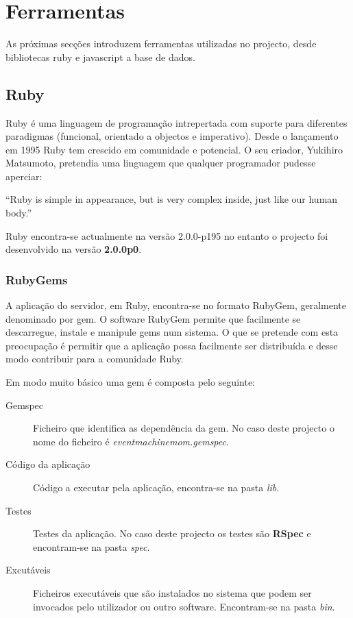 \section{Ferramentas}

As próximas secções introduzem ferramentas utilizadas no projecto, desde bibliotecas ruby e javascript a base de dados.

\subsection{Ruby}

Ruby é uma linguagem de programação intrepertada com suporte para diferentes paradigmas (funcional, orientado a objectos e imperativo). Desde o lançamento em 1995 Ruby tem crescido em comunidade e potencial. O seu criador, Yukihiro Matsumoto, pretendia uma linguagem que qualquer programador pudesse aperciar:

``Ruby is simple in appearance, but is very complex inside, just like our human body.'' \cite{matz}

Ruby encontra-se actualmente na versão 2.0.0-p195 no entanto o projecto foi desenvolvido na versão \textbf{2.0.0p0}.


\subsubsection{RubyGems}

A aplicação do servidor, em Ruby, encontra-se no formato RubyGem, geralmente denominado por gem. O software RubyGem permite que facilmente se descarregue, instale e manipule gems num sistema.\cite{rubygems} O que se pretende com esta preocupação é permitir que a aplicação possa facilmente ser distribuída e desse modo contribuir para a comunidade Ruby.

Em modo muito básico uma gem é composta pelo seguinte:

\begin{description}
\item[Gemspec] Ficheiro que identifica as dependência da gem. No caso deste projecto o nome do ficheiro é \textit{eventmachinemom.gemspec}.
\item[Código da aplicação] Código a executar pela aplicação, encontra-se na pasta \textit{lib}.
\item[Testes] Testes da aplicação. No caso deste projecto os testes são \textbf{RSpec} e encontram-se na pasta \textit{spec}.
\item[Excutáveis] Ficheiros executáveis que são instalados no sistema que podem ser invocados pelo utilizador ou outro software. Encontram-se na pasta \textit{bin}.
\end{description}


